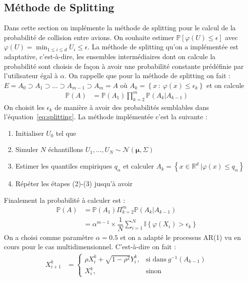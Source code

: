 \documentclass[a4paper, 12pt,twoside]{article}
\numberwithin{equation}{subsection}
\begin{document}
	
	\subsection{Méthode de Splitting} %
	\label{sub:methode_de_splitting}
	Dans cette section on implémente la méthode de splitting pour le calcul de la probabilité de collision entre avions. On souhaite estimer $\mathbb{P}[\varphi(U)\leq \epsilon]$ avec $\varphi(U)= \min_{1\leq i \leq d} U_i \leq \epsilon$. La méthode de splitting qu'on a implémentée est adaptative, c'est-à-dire, les ensembles intermédiaires dont on calcule la probabilité sont choisis de façon à avoir une probabilité constante prédéfinie par l'utilisateur égal à $\alpha$. On rappelle que pour la méthode de splitting on fait : $E = A_0 \supset A_1 \supset \ldots \supset A_{m-1} \supset A_m = A$ où $A_k = \left\{x~:~\varphi(x)\leq \epsilon_k\right\}$ et on calcule 
	\begin{align}
		\mathbb{P}(A) &= \mathbb{P}(A_1) \prod _{k=2}^{m} \mathbb{P}(A_{k}|A_{k-1})
		\label{eq:splitting}
	\end{align}
	On choisit les $\epsilon_{k}$ de manière à avoir des probabilités semblables dans l'équation~\eqref{eq:splitting}. La méthode implémentée c'est la suivante :
	\begin{enumerate}
		\item Initialiser $U_0$ tel que 
		\item Simuler $N$ échantillons $U_1,\ldots,U_N \sim \mathcal{N}(\boldsymbol \mu, \Sigma)$
		\item Estimer les quantiles empiriques $q_{\alpha}$ et calculer $A_k=\left\{ x\in \mathbb{R}^d ~| \varphi(x) \leq q_{\alpha} \right\}$
		\item Répéter les étapes (2)-(3) jusqu'à avoir 
	\end{enumerate}
	Finalement la probabilité à calculer est :  
	\begin{align}
		\mathbb{P}(A) &= \mathbb{P}(A_1) \Pi_{k=2}^{m} \mathbb{P}(A_{k}|A_{k-1}) \\
		&= \alpha^{m-1} \times \dfrac{1}{N} \sum_{i=1}^{N} \mathbb{I}\left\{\varphi(X_i)>\epsilon_k \right\}
		\label{eq:splittingAda}
	\end{align}
	On a choisi comme paramètre $\alpha=0.5$ et on a adapté le processus AR(1) vu en cours pour le cas multidimensionnel. C'est-à-dire on fait : 
	\begin{align}
		X_{i+1}^{k} &= 
		\begin{cases}
		      \rho X_i^{k} + \sqrt{1 - \rho^2} Y_i^{k}, & \text{si dans}\ g^{-1}(A_{k-1}) \\
		      X_i^{k}, & \text{sinon}
		\end{cases}
	\end{align}
\end{document}
